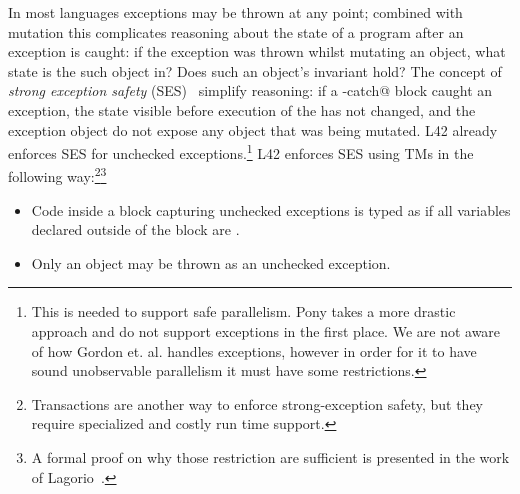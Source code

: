\loseSpace
{}
In most languages exceptions may be thrown at any point; combined with mutation this complicates reasoning about the state of a program after an exception is caught: if the exception was thrown whilst mutating an object, what state is the such object in? Does such an object's invariant hold?
The concept of \emph{strong exception safety} (SES)~\cite{Abrahams2000,JOT:issue_2011_01/article1} simplify reasoning:
if a \Q@try-catch@ block caught an exception, the state visible before execution of the \Q@try@ has not changed, and the exception object do not expose any object that was being mutated.
L42 already enforces SES for unchecked exceptions.\footnote{
This is needed to support safe parallelism. Pony takes a more drastic approach and do not support exceptions in the first place. 
We are not aware of how Gordon et. al. handles exceptions, however in order for it to have sound unobservable parallelism it must have some restrictions.
}
L42 enforces SES using TMs in the following way:\footnote{Transactions are another way to enforce strong-exception safety, but they require specialized and costly run time support.}\footnote{A formal proof on why those restriction are sufficient is presented in the work of Lagorio~\cite{JOT:issue_2011_01/article1}.}
\begin{itemize}
\item Code inside a \Q@try@ block capturing unchecked exceptions is typed as if all \Q@mut@ variables declared outside of the block are \Q@read@.
\item Only an \Q@imm@ object may be thrown as an unchecked exception.
\end{itemize} 

